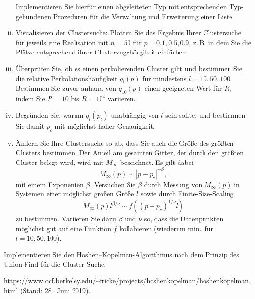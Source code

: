 \begin{question}[subtitle=Perkolationschwelle]
\begin{enumerate}[(i)]
    Implementieren Sie hierfür einen abgeleiteten Typ mit entsprechenden Typ-gebundenen Prozeduren für die Verwaltung und Erweiterung einer Liste.
  \item Visualisieren der Clustersuche: Plotten Sie das Ergebnis Ihrer Clustersuche für jeweils eine Realisation mit $n = 50$ für $p = 0.1, 0.5, 0.9$, z.\,B. in dem Sie die Plätze entsprechend ihrer Clusterzugehörgikeit einfärben.
  \item Überprüfen Sie, ob es einen perkolierenden Cluster gibt und bestimmen Sie die relative Perkolationshäufigkeit $q_l(p)$ für mindestens $l = 10, 50, 100$.
    Bestimmen Sie zuvor anhand von $q_{10}(p)$ einen geeigneten Wert für $R$, indem Sie $R = 10$ bis $R = 10^4$ variieren.
  \item Begründen Sie, warum $q_l(p_c)$ unabhängig von $l$ sein sollte, und bestimmen Sie damit $p_c$ mit möglichst hoher Genauigkeit.
  \item Ändern Sie Ihre Clustersuche so ab, dass Sie auch die Größe des größten Clusters bestimmen.
    Der Anteil am gesamten Gitter, der durch den größten Cluster belegt wird, wird mit $M_∞$ bezeichnet.
    Es gilt dabei
    \begin{equation}
      M_∞ (p) \sim |p - p_c|^{-β},
    \end{equation}
    mit einem Exponenten $β$.
    Versuchen Sie $β$ durch Messung von $M_∞(p)$ in Systemen einer möglichst großen Größe $l$ sowie durch Finite-Size-Scaling
    \begin{equation}
      M_∞(p) l^{β/ν} \sim f\left( (p - p_c)^{1/ν} l \right)
    \end{equation}
    zu bestimmen.
    Variieren Sie dazu $β$ und $ν$ so, dass die Datenpunkten möglichst gut auf eine Funktion $f$ kollabieren (wiederum min.\ für $l = 10, 50, 100$).
  \end{enumerate}
\end{question}

\begin{question}[subtitle=Union-Find-Algorithmus]
  Implementieren Sie den Hoshen--Kopelman-Algorithmus nach dem Prinzip des Union-Find für die Cluster-Suche.

  \url{https://www.ocf.berkeley.edu/~fricke/projects/hoshenkopelman/hoshenkopelman.html} (Stand: 28.\ Juni 2019).
\end{question}

